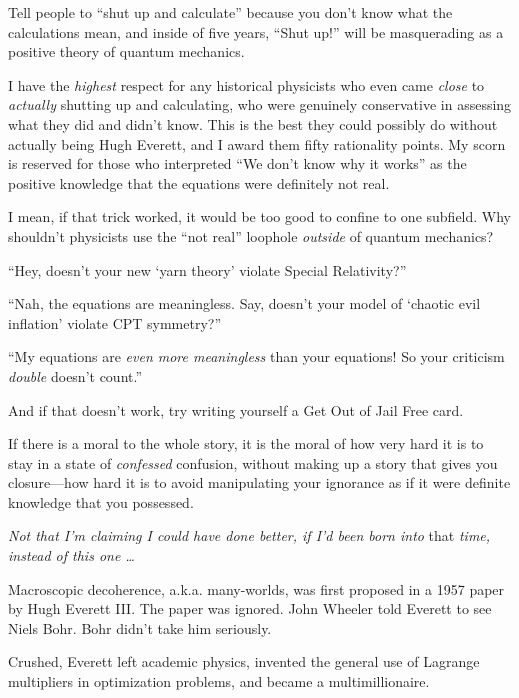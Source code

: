 {
 Tell people to ``shut up and
calculate'' because you don't know
what the calculations mean, and inside of five years,
``Shut up!'' will be masquerading as
a positive theory of quantum mechanics.}

{
 I have the \textit{highest} respect for any historical physicists
who even came \textit{close} to \textit{actually} shutting up and
calculating, who were genuinely conservative in assessing what they did
and didn't know. This is the best they could possibly
do without actually being Hugh Everett, and I award them fifty
rationality points. My scorn is reserved for those who interpreted
``We don't know why it
works'' as the positive knowledge that the equations
were definitely not real.}

{
 I mean, if that trick worked, it would be too good to confine to
one subfield. Why shouldn't physicists use the
``not real'' loophole
\textit{outside} of quantum mechanics?}

{
 ``Hey, doesn't your new
`yarn theory' violate Special
Relativity?''}

{
 ``Nah, the equations are meaningless. Say,
doesn't your model of `chaotic evil
inflation' violate CPT symmetry?''}

{
 ``My equations are \textit{even more meaningless}
than your equations! So your criticism \textit{double}
doesn't count.''}

{
 And if that doesn't work, try writing yourself a
Get Out of Jail Free card.}

{
 If there is a moral to the whole story, it is the moral of how
very hard it is to stay in a state of \textit{confessed} confusion,
without making up a story that gives you closure---how hard it is to
avoid manipulating your ignorance as if it were definite knowledge that
you possessed.}

\myendsectiontext


{
 \textit{Not that I'm claiming I could have done
better, if I'd been born into} that \textit{time,
instead of this one \ldots} }

{
 Macroscopic decoherence, a.k.a. many-worlds, was first proposed in
a 1957 paper by Hugh Everett III. The paper was ignored. John Wheeler
told Everett to see Niels Bohr. Bohr didn't take him
seriously.}

{
 Crushed, Everett left academic physics, invented the general use
of Lagrange multipliers in optimization problems, and became a
multimillionaire.}


